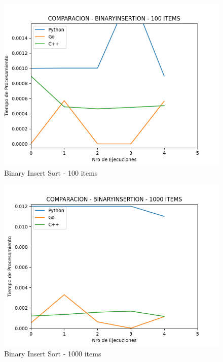 \documentclass[12pt]{article} %
\begin{document}
\vspace{6cm}



\begin{figure}[H]
    \centering
    \includegraphics[width=\textwidth]{binaryInsertion_100}
    \caption{Binary Insert Sort - 100 items}
    \end{figure}
    
    \vspace{5mm}
    
    \begin{figure}[H]
    \centering
    \includegraphics[width=\textwidth]{binaryInsertion_1000}
    \caption{Binary Insert Sort - 1000 items}
    \end{figure}
    
\end{document}
